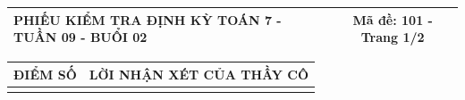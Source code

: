 \documentclass[12pt,a4paper]{article}
\begin{document}
\pagestyle{empty}
\noindent
\begin{tabularx}{\linewidth}{|X|c|}
\hline
\textbf{PHIẾU KIỂM TRA ĐỊNH KỲ TOÁN 7 - TUẦN 09 - BUỔI 02} & \textbf{Mã đề: 101 - Trang 1/2} \\
\hline
\end{tabularx}

\vspace{1.2mm}

\noindent
\begin{tabularx}{\linewidth}{|p{3.2cm}|X|}
\hline
\centering\textbf{ĐIỂM SỐ} & \centering\textbf{LỜI NHẬN XÉT CỦA THẦY CÔ} \tabularnewline
\hline
\rule{0pt}{1.8cm} & \tabularnewline
\hline
\end{tabularx}
\end{document}
